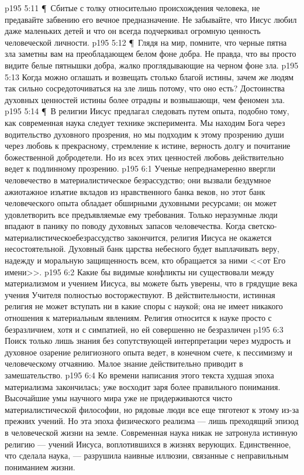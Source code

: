 \vs p195 5:11 \P\ Сбитые с толку относительно происхождения человека, не предавайте забвению его вечное предназначение. Не забывайте, что Иисус любил даже маленьких детей и что он всегда подчеркивал огромную ценность человеческой личности.
\vs p195 5:12 \P\ Глядя на мир, помните, что черные пятна зла заметны вам на преобладающем белом фоне добра. Не правда, что вы просто видите белые пятнышки добра, жалко проглядывающие на черном фоне зла.
\vs p195 5:13 Когда можно оглашать и возвещать столько благой истины, зачем же людям так сильно сосредоточиваться на зле лишь потому, что оно есть? Достоинства духовных ценностей истины более отрадны и возвышающи, чем феномен зла.
\vs p195 5:14 \P\ В религии Иисус предлагал следовать путем опыта, подобно тому, как современная наука следует технике эксперимента. Мы находим Бога через водительство духовного прозрения, но мы подходим к этому прозрению души через любовь к прекрасному, стремление к истине, верность долгу и почитание божественной добродетели. Но из всех этих ценностей любовь действительно ведет к подлинному прозрению.
\vs p195 6:1 Ученые непреднамеренно ввергли человечество в материалистическое безрассудство; они вызвали бездумное ажиотажное изъятие вкладов из нравственного банка веков, но этот банк человеческого опыта обладает обширными духовными ресурсами; он может удовлетворить все предъявляемые ему требования. Только неразумные люди впадают в панику по поводу духовных запасов человечества. Когда светско\hyp{}материалистическоебезрассудство закончится, религия Иисуса не окажется несостоятельной. Духовный банк царства небесного будет выплачивать веру, надежду и моральную защищенность всем, кто обращается за ними <<от Его имени>>.
\vs p195 6:2 Какие бы видимые конфликты ни существовали между материализмом и учением Иисуса, вы можете быть уверены, что в грядущие века учения Учителя полностью восторжествуют. В действительности, истинная религия не может вступать ни в какие споры с наукой; она не имеет никакого отношения к материальным явлениям. Религия относится к науке просто с безразличием, хотя и с симпатией, но ей совершенно не безразличен 
\vs p195 6:3 Поиск только лишь знания без сопутствующей интерпретации через мудрость и духовное озарение религиозного опыта ведет, в конечном счете, к пессимизму и человеческому отчаянию. Малое знание действительно приводит в замешательство.
\vs p195 6:4 Ко времени написания этого текста худшая эпоха материализма закончилась; уже восходит заря более правильного понимания. Высочайшие умы научного мира уже не придерживаются чисто материалистической философии, но рядовые люди все еще тяготеют к этому из\hyp{}за прежних учений. Но эта эпоха физического реализма --- лишь преходящий эпизод в человеческой жизни на земле. Современная наука никак не затронула истинную религию --- учений Иисуса, воплотившихся в жизнях верующих. Единственное, что сделала наука, --- разрушила наивные иллюзии, связанные с неправильным пониманием жизни.
